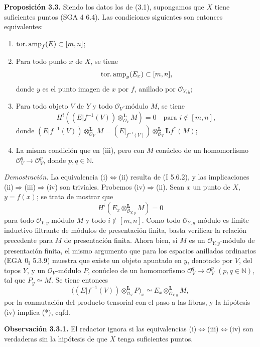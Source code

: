 \textbf{Proposición 3.3.} Siendo los datos los de (3.1), supongamos que \(X\) tiene suficientes puntos (SGA 4  6.4). Las condiciones siguientes son entonces equivalentes: %
\begin{enumerate}[label=(\roman*)]
\item \(\operatorname{tor.amp}_f(E)\subset[m,n]\);
\item Para todo punto \(x\) de \(X\), se tiene
\[
  \operatorname{tor.amp}_y(E_x)\subset[m,n],
\]
donde \(y\) es el punto imagen de \(x\) por \(f\), anillado por \(\mathcal O_{Y,y}\);
\item Para todo objeto \(V\) de \(Y\) y todo \(\mathcal O_V\)-módulo \(M\), se tiene
\[
  H^i\left((E|f^{-1}(V))\otimes_{\mathcal O_V}^{\mathbf L}M\right)=0
  \quad\text{para }i\notin[m,n],
\]
donde \((E|f^{-1}(V))\otimes_{\mathcal O_V}^{\mathbf L}M=(E\vert_{f^{-1}(V)})\otimes_{\mathcal O_V}^{\mathbf L}\mathbf Lf^*(M)\);
\item La misma condición que en (iii), pero con \(M\) conúcleo de un homomorfismo \(\mathcal O_V^q\longrightarrow\mathcal O_V^p\), donde \(p,q\in\mathbb N\).
\end{enumerate}

\emph{Demostración.} La equivalencia (i)\(\Longleftrightarrow\)(ii) resulta de (I 5.6.2), y las implicaciones (ii)\(\Longrightarrow\)(iii)\(\Longrightarrow\)(iv) son triviales. Probemos (iv)\(\Longrightarrow\)(ii). Sean \(x\) un punto de \(X\), \(y=f(x)\); se trata de mostrar que
\begin{equation}\tag{$*$}
  H^i(E_x\otimes_{\mathcal O_{Y,y}}^{\mathbf L}M)=0
\end{equation}
para todo \(\mathcal O_{Y,y}\)-módulo \(M\) y todo \(i\notin[m,n]\). Como todo \(\mathcal O_{Y,y}\)-módulo es límite inductivo filtrante de módulos de presentación finita, basta verificar la relación precedente para \(M\) de presentación finita. Ahora bien, si \(M\) es un \(\mathcal O_{Y,y}\)-módulo de presentación finita, el mismo argumento que para los espacios anillados ordinarios (EGA \(0_{\mathrm I}\) 5.3.9) muestra que existe un objeto apuntado en \(y\), denotado por \(V\), del topos \(Y\), y un \(\mathcal O_V\)-módulo \(P\), conúcleo de un homomorfismo \(\mathcal O_V^q\longrightarrow\mathcal O_V^p\) \((p,q\in\mathbb N)\), tal que \(P_y\simeq M\). Se tiene entonces
\[
  \bigl((E|f^{-1}(V))\otimes_{\mathcal O_V}^{\mathbf L}P\bigr)_x
  \simeq
  E_x\otimes_{\mathcal O_{Y,y}}^{\mathbf L}M,
\]
por la conmutación del producto tensorial con el paso a las fibras, y la hipótesis (iv) implica (*), cqfd.

\textbf{Observación 3.3.1.} El redactor ignora si las equivalencias (i)\(\Longleftrightarrow\)(iii)\(\Longleftrightarrow\)(iv) son verdaderas sin la hipótesis de que \(X\) tenga suficientes puntos.
